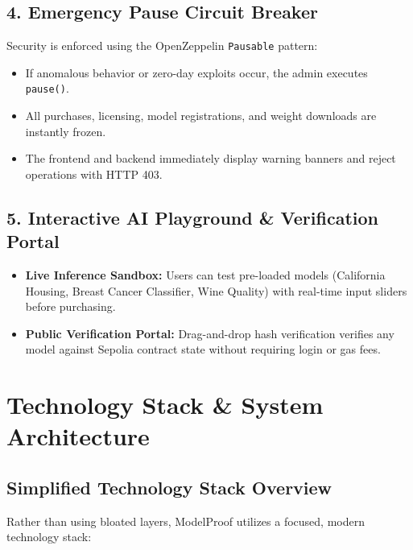 \documentclass[11pt,a4paper]{article}
\begin{document}
\subsection{4. Emergency Pause Circuit Breaker}
Security is enforced using the OpenZeppelin \texttt{Pausable} pattern:
\begin{itemize}[leftmargin=1.5em]
    \item If anomalous behavior or zero-day exploits occur, the admin executes \texttt{pause()}.
    \item All purchases, licensing, model registrations, and weight downloads are instantly frozen.
    \item The frontend and backend immediately display warning banners and reject operations with HTTP 403.
\end{itemize}

\subsection{5. Interactive AI Playground \& Verification Portal}
\begin{itemize}[leftmargin=1.5em]
    \item \textbf{Live Inference Sandbox:} Users can test pre-loaded models (California Housing, Breast Cancer Classifier, Wine Quality) with real-time input sliders before purchasing.
    \item \textbf{Public Verification Portal:} Drag-and-drop hash verification verifies any model against Sepolia contract state without requiring login or gas fees.
\end{itemize}

\clearpage

\section{Technology Stack \& System Architecture}

\subsection{Simplified Technology Stack Overview}
Rather than using bloated layers, ModelProof utilizes a focused, modern technology stack:
\end{document}

